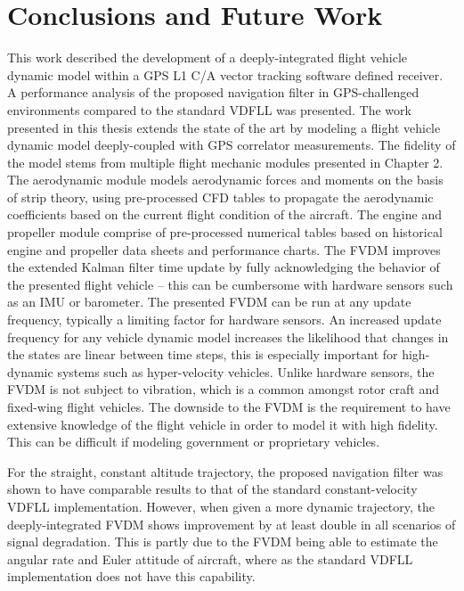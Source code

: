 \chapter{\textbf{Conclusions and Future Work}}
This work described the development of a deeply-integrated flight vehicle dynamic model within a GPS L1 C/A vector tracking software defined receiver. A performance analysis of the proposed navigation filter in GPS-challenged environments compared to the standard VDFLL was presented. The work presented in this thesis extends the state of the art by modeling a flight vehicle dynamic model deeply-coupled with GPS correlator measurements. The fidelity of the model stems from multiple flight mechanic modules presented in Chapter 2. The aerodynamic module models aerodynamic forces and moments on the basis of strip theory, using pre-processed CFD tables to propagate the aerodynamic coefficients based on the current flight condition of the aircraft. The engine and propeller module comprise of pre-processed numerical tables based on historical engine and propeller data sheets and performance charts. The FVDM improves the extended Kalman filter time update by fully acknowledging the behavior of the presented flight vehicle {--} this can be cumbersome with hardware sensors such as an IMU or barometer. The presented FVDM can be run at any update frequency, typically a limiting factor for hardware sensors. An increased update frequency for any vehicle dynamic model increases the likelihood that changes in the states are linear between time steps, this is especially important for high-dynamic systems such as hyper-velocity vehicles. Unlike hardware sensors, the FVDM is not subject to vibration, which is a common amongst rotor craft and fixed-wing flight vehicles. The downside to the FVDM is the requirement to have extensive knowledge of the flight vehicle in order to model it with high fidelity. This can be difficult if modeling government or proprietary vehicles.

For the straight, constant altitude trajectory, the proposed navigation filter was shown to have comparable results to that of the standard constant-velocity VDFLL implementation. However, when given a more dynamic trajectory, the deeply-integrated FVDM shows improvement by at least double in all scenarios of signal degradation. This is partly due to the FVDM being able to estimate the angular rate and Euler attitude of aircraft, where as the standard VDFLL implementation does not have this capability.


